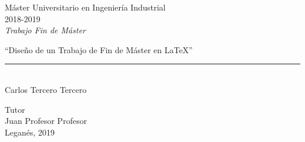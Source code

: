 \documentclass[12pt]{report} %
\begin{document}
	
\begin{titlepage}
		\begin{sffamily}
		\color{azulUC3M}
		\begin{center}
			\begin{figure}[H] %
			\end{figure}
			\vspace{1cm}
			\begin{Large}
				Máster Universitario en Ingeniería Industrial\\			
				2018-2019\\
				\vspace{1cm}		
				\textsl{Trabajo Fin de Máster}
				\bigskip
				
			\end{Large}
			{\Huge ``Diseño de un Trabajo de Fin de Máster en \LaTeX''}\\
			\vspace*{0.5cm}
			\rule{10.5cm}{0.1mm}\\
			\vspace*{0.9cm}
			{\LARGE Carlos Tercero Tercero}\\ 
			\vspace*{1cm}
			\begin{Large}
				Tutor\\
				Juan Profesor Profesor\\
				Leganés, 2019\\
			\end{Large}
		\end{center}
		

\end{sffamily}
\end{titlepage}
\end{document}
